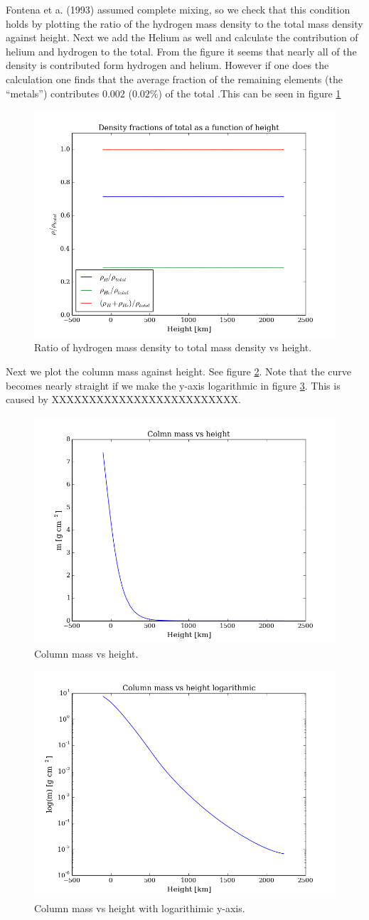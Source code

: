 \documentclass{aa}   %
\begin{document}
Fontena et a. (1993) assumed complete mixing, so we check that this condition holds by plotting the ratio of the hydrogen mass density to the total mass density against height. Next we add the Helium as well and calculate the contribution of helium and hydrogen to the total. From the figure it seems that nearly all of the density is contributed form hydrogen and helium. However if one does the calculation one finds that the average fraction of the remaining elements (the ``metals'') contributes $0.002$ ($0.02 \%$) of the total .This can be seen in figure \ref{Hdensratio_height}
\begin{figure}
 \includegraphics[width=.49\textwidth]{Hdensratio_height.png}
 \caption{Ratio of hydrogen mass density to total mass density vs height.}
 \label{Hdensratio_height} 
\end{figure}

Next we plot the column mass against height. See figure \ref{colm_height}. Note that the curve becomes nearly straight if we make the y-axis logarithmic in figure \ref{colm_height_log}. This is caused by XXXXXXXXXXXXXXXXXXXXXXXXX.
\begin{figure}
 \includegraphics[width=.49\textwidth]{col_height.png}
 \caption{Column mass vs height.}
 \label{colm_height} 
\end{figure}

\begin{figure}
 \includegraphics[width=.49\textwidth]{col_height_log.png}
 \caption{Column mass vs height with logarithimic y-axis.}
 \label{colm_height_log} 
\end{figure}
\end{document}
